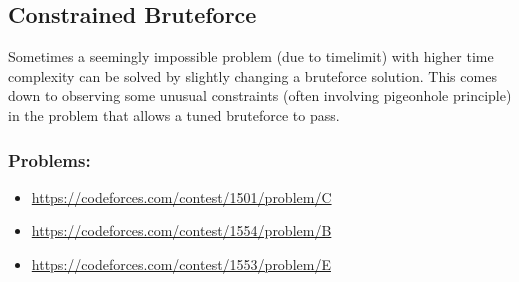 \subsection{Constrained Bruteforce}
Sometimes a seemingly impossible problem (due to timelimit) with higher time complexity can be solved by slightly changing a bruteforce solution. This comes down to observing some unusual constraints (often involving pigeonhole principle) in the problem that allows a tuned bruteforce to pass.

\subsubsection*{Problems:}
\begin{itemize}
\item \url{https://codeforces.com/contest/1501/problem/C}
\item \url{https://codeforces.com/contest/1554/problem/B}
\item \url{https://codeforces.com/contest/1553/problem/E}
\end{itemize}
